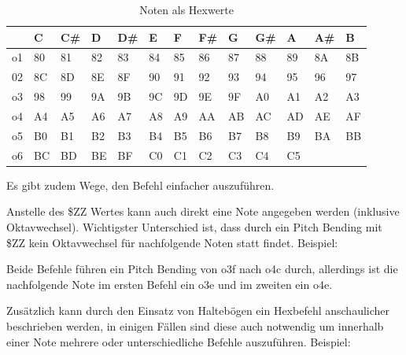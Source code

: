 \begin{table}
\begin{tabularx}{\textwidth}{|l|X|X|X|X|X|X|X|X|X|X|X|X|}
	\hline
	& C & C\# & D & D\# & E & F & F\# & G & G\# & A & A\# & B   \\
	\hline
	o1 & 80 & 81 & 82 & 83 & 84 & 85 & 86 & 87 & 88 & 89 & 8A & 8B \\
	\hline
	02 & 8C & 8D & 8E & 8F & 90 & 91 & 92 & 93 & 94 & 95 & 96 & 97 \\
	\hline
	o3 & 98 & 99 & 9A & 9B & 9C & 9D & 9E & 9F & A0 & A1 & A2 & A3 \\
	\hline
	o4 & A4 & A5 & A6 & A7 & A8 & A9 & AA & AB & AC & AD & AE & AF \\
	\hline
	o5 & B0 & B1 & B2 & B3 & B4 & B5 & B6 & B7 & B8 & B9 & BA & BB \\
	\hline
	o6 & BC & BD & BE & BF & C0 & C1 & C2 & C3 & C4 & C5 & & \\
	\hline
\end{tabularx}
\caption{Noten als Hexwerte}
\label{Noten}
\end{table}


Es gibt zudem Wege, den Befehl einfacher auszuführen.

\bigskip

Anstelle des \$ZZ Wertes kann auch direkt eine Note angegeben werden (inklusive Oktavwechsel). Wichtigster Unterschied ist, dass durch ein Pitch Bending mit \$ZZ kein Oktavwechsel für nachfolgende Noten statt findet. Beispiel:

\medskip



\medskip

Beide Befehle führen ein Pitch Bending von o3f nach o4c durch, allerdings ist die nachfolgende Note im ersten Befehl ein o3e und im zweiten ein o4e.

\bigskip

Zusätzlich kann durch den Einsatz von Haltebögen ein Hexbefehl anschaulicher beschrieben werden, in einigen Fällen sind diese auch notwendig um innerhalb einer Note mehrere oder unterschiedliche Befehle auszuführen. Beispiel:

\medskip



\medskip


